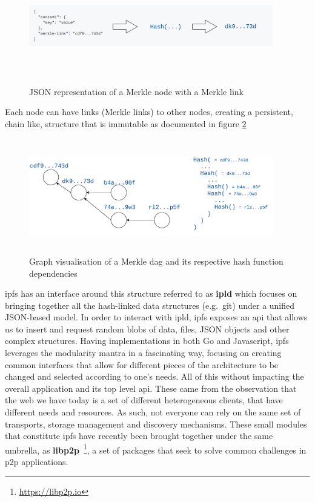 \begin{figure}[hb!]
  \centering
  \includegraphics[max height=5cm,max width=0.95\textwidth]{img/merkle-node.png}
  \caption{JSON representation of a Merkle node with a Merkle link}
  \label{fig:merkle-node}
\end{figure}

Each node can have links (Merkle links) to other nodes, creating a persistent,
chain like, structure that is immutable as documented in figure
\ref{fig:merkle-dag}

\begin{figure}[hb!]
  \centering
  \includegraphics[max height=5cm,max width=0.95\textwidth]{img/merkle-dag.png}
  \caption{Graph visualisation of a Merkle \acrshort{dag} and its respective hash function dependencies}
  \label{fig:merkle-dag}
\end{figure}

\acrshort{ipfs} has an interface around this structure referred to as
\textbf{\acrfull{ipld}} which focuses on bringing together all the hash-linked
data structures (e.g.~git) under a unified JSON-based model. In order to
interact with \acrshort{ipld}, \acrshort{ipfs} exposes an \acrshort{api} that
allows us to insert and request random blobs of data, files, JSON objects and
other complex structures. Having implementations in both Go and Javascript,
\acrshort{ipfs} leverages the modularity mantra in a fascinating way, focusing
on creating common interfaces that allow for different pieces of the
architecture to be changed and selected according to one's needs.  All of this
without impacting the overall application and its top level \acrshort{api}.
These came from the observation that the web we have today is a set of
different heterogeneous clients, that have different needs and resources. As
such, not everyone can rely on the same set of transports, storage management
and discovery mechanisms. These small modules that constitute \acrshort{ipfs}
have recently been brought together under the same umbrella, as
\textbf{libp2p}~\footnote{\url{https://libp2p.io}}, a set of packages that seek to
solve common challenges in \acrshort{p2p} applications. 

